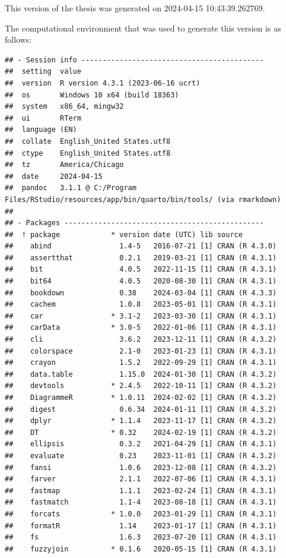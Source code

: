 \documentclass[print]{nuthesis}
\begin{document}
This version of the thesis was generated on 2024-04-15 10:43:39.262769.

The computational environment that was used to generate this version is as follows:

\begin{verbatim}
## - Session info -------------------------------------------
##  setting  value
##  version  R version 4.3.1 (2023-06-16 ucrt)
##  os       Windows 10 x64 (build 18363)
##  system   x86_64, mingw32
##  ui       RTerm
##  language (EN)
##  collate  English_United States.utf8
##  ctype    English_United States.utf8
##  tz       America/Chicago
##  date     2024-04-15
##  pandoc   3.1.1 @ C:/Program Files/RStudio/resources/app/bin/quarto/bin/tools/ (via rmarkdown)
## 
## - Packages -----------------------------------------------
##  ! package            * version date (UTC) lib source
##    abind                1.4-5   2016-07-21 [1] CRAN (R 4.3.0)
##    assertthat           0.2.1   2019-03-21 [1] CRAN (R 4.3.1)
##    bit                  4.0.5   2022-11-15 [1] CRAN (R 4.3.1)
##    bit64                4.0.5   2020-08-30 [1] CRAN (R 4.3.1)
##    bookdown             0.38    2024-03-04 [1] CRAN (R 4.3.3)
##    cachem               1.0.8   2023-05-01 [1] CRAN (R 4.3.1)
##    car                * 3.1-2   2023-03-30 [1] CRAN (R 4.3.1)
##    carData            * 3.0-5   2022-01-06 [1] CRAN (R 4.3.1)
##    cli                  3.6.2   2023-12-11 [1] CRAN (R 4.3.2)
##    colorspace           2.1-0   2023-01-23 [1] CRAN (R 4.3.1)
##    crayon               1.5.2   2022-09-29 [1] CRAN (R 4.3.1)
##    data.table           1.15.0  2024-01-30 [1] CRAN (R 4.3.2)
##    devtools           * 2.4.5   2022-10-11 [1] CRAN (R 4.3.2)
##    DiagrammeR         * 1.0.11  2024-02-02 [1] CRAN (R 4.3.2)
##    digest               0.6.34  2024-01-11 [1] CRAN (R 4.3.2)
##    dplyr              * 1.1.4   2023-11-17 [1] CRAN (R 4.3.2)
##    DT                 * 0.32    2024-02-19 [1] CRAN (R 4.3.2)
##    ellipsis             0.3.2   2021-04-29 [1] CRAN (R 4.3.1)
##    evaluate             0.23    2023-11-01 [1] CRAN (R 4.3.2)
##    fansi                1.0.6   2023-12-08 [1] CRAN (R 4.3.2)
##    farver               2.1.1   2022-07-06 [1] CRAN (R 4.3.1)
##    fastmap              1.1.1   2023-02-24 [1] CRAN (R 4.3.1)
##    fastmatch            1.1-4   2023-08-18 [1] CRAN (R 4.3.1)
##    forcats            * 1.0.0   2023-01-29 [1] CRAN (R 4.3.1)
##    formatR              1.14    2023-01-17 [1] CRAN (R 4.3.1)
##    fs                   1.6.3   2023-07-20 [1] CRAN (R 4.3.1)
##    fuzzyjoin          * 0.1.6   2020-05-15 [1] CRAN (R 4.3.1)

\end{verbatim}
\end{document}

